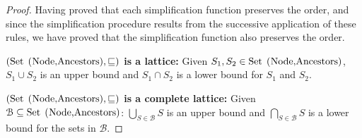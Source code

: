 \begin{proof}
	Having proved
	that each simplification function preserves the order, and
	since the simplification procedure results from the successive 
	application of these rules, we have proved that the simplification
	function also preserves the order.\smallskip
	
	\noindent\textbf{$(\text{\lstinline{Set (Node,Ancestors)}}, \leqSets)$
	is a lattice:} Given 
	$S_1, S_2\in \text{\lstinline{Set (Node,Ancestors)}}$,
	$S_1 \cup S_2$ is an upper bound and
	$S_1 \cap S_2$ is a lower bound for $S_1$ and $S_2$.\smallskip
	
	\noindent\textbf{$(\text{\lstinline{Set (Node,Ancestors)}}, \leqSets)$
	is a complete lattice:} Given 
	$\mathcal{B}\subseteq \text{\lstinline{Set (Node,Ancestors)}}$:
	$\bigcup_{S\in \mathcal{B}} S$ is an upper bound and
	$\bigcap_{S\in \mathcal{B}} S$ is a lower bound for the sets in 
	$\mathcal{B}$.
	

\end{proof}
